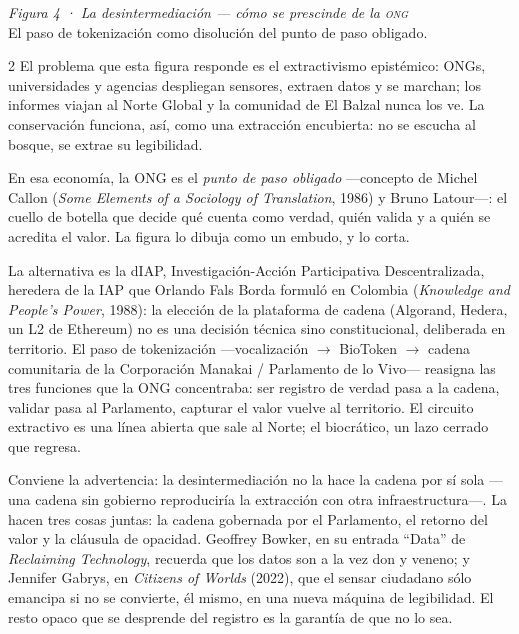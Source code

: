 \documentclass[11pt]{article}
\begin{document}
\newpage
{\Large\itshape Figura 4 · La desintermediación — cómo se prescinde de la \textsc{\large ong}}\\[0.15em]
{\small\color{ink!60}El paso de tokenización como disolución del punto de paso obligado.}
\vspace{0.5em}

\begin{multicols}{2}\small\setlength{\parindent}{1em}\setlength{\parskip}{0.45em}
El problema que esta figura responde es el extractivismo epistémico: ONGs, universidades y agencias despliegan sensores, extraen datos y se marchan; los informes viajan al Norte Global y la comunidad de El Balzal nunca los ve. La conservación funciona, así, como una extracción encubierta: no se escucha al bosque, se extrae su legibilidad.

En esa economía, la ONG es el \emph{punto de paso obligado} —concepto de Michel Callon (\emph{Some Elements of a Sociology of Translation}, 1986) y Bruno Latour—: el cuello de botella que decide qué cuenta como verdad, quién valida y a quién se acredita el valor. La figura lo dibuja como un embudo, y lo corta.

La alternativa es la dIAP, Investigación-Acción Participativa Descentralizada, heredera de la IAP que Orlando Fals Borda formuló en Colombia (\emph{Knowledge and People's Power}, 1988): la elección de la plataforma de cadena (Algorand, Hedera, un L2 de Ethereum) no es una decisión técnica sino constitucional, deliberada en territorio. El paso de tokenización —vocalización $\rightarrow$ BioToken $\rightarrow$ cadena comunitaria de la Corporación Manakai / Parlamento de lo Vivo— reasigna las tres funciones que la ONG concentraba: ser registro de verdad pasa a la cadena, validar pasa al Parlamento, capturar el valor vuelve al territorio. El circuito extractivo es una línea abierta que sale al Norte; el biocrático, un lazo cerrado que regresa.

Conviene la advertencia: la desintermediación no la hace la cadena por sí sola —una cadena sin gobierno reproduciría la extracción con otra infraestructura—. La hacen tres cosas juntas: la cadena gobernada por el Parlamento, el retorno del valor y la cláusula de opacidad. Geoffrey Bowker, en su entrada ``Data'' de \emph{Reclaiming Technology}, recuerda que los datos son a la vez don y veneno; y Jennifer Gabrys, en \emph{Citizens of Worlds} (2022), que el sensar ciudadano sólo emancipa si no se convierte, él mismo, en una nueva máquina de legibilidad. El resto opaco que se desprende del registro es la garantía de que no lo sea.
\end{multicols}
\end{document}
